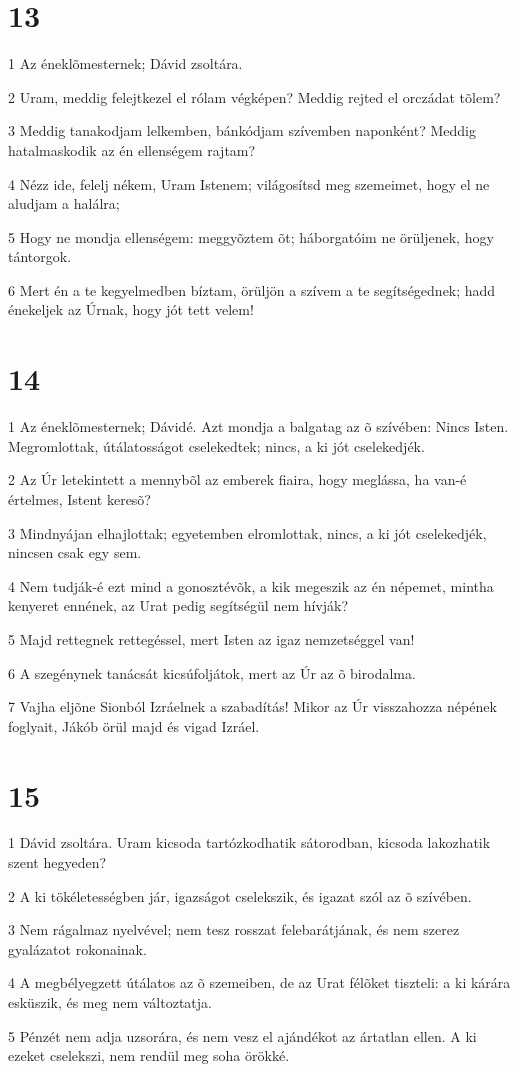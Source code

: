 \chapter{13}

\par 1 Az éneklõmesternek; Dávid zsoltára.
\par 2 Uram, meddig felejtkezel el rólam végképen? Meddig rejted el orczádat tõlem?
\par 3 Meddig tanakodjam lelkemben, bánkódjam szívemben naponként? Meddig hatalmaskodik az én ellenségem rajtam?
\par 4 Nézz ide, felelj nékem, Uram Istenem; világosítsd meg szemeimet, hogy el ne aludjam a halálra;
\par 5 Hogy ne mondja ellenségem: meggyõztem õt; háborgatóim ne örüljenek, hogy tántorgok.
\par 6 Mert én a te kegyelmedben bíztam, örüljön a szívem a te segítségednek; hadd énekeljek az Úrnak, hogy jót tett velem!

\chapter{14}

\par 1 Az éneklõmesternek; Dávidé. Azt mondja a balgatag az õ szívében: Nincs Isten. Megromlottak, útálatosságot cselekedtek; nincs, a ki jót cselekedjék.
\par 2 Az Úr letekintett a mennybõl az emberek fiaira, hogy meglássa, ha van-é értelmes, Istent keresõ?
\par 3 Mindnyájan elhajlottak; egyetemben elromlottak, nincs, a ki jót cselekedjék, nincsen csak egy sem.
\par 4 Nem tudják-é ezt mind a gonosztévõk, a kik megeszik az én népemet, mintha kenyeret ennének, az Urat pedig segítségül nem hívják?
\par 5 Majd rettegnek rettegéssel, mert Isten az igaz nemzetséggel van!
\par 6 A szegénynek tanácsát kicsúfoljátok, mert az Úr az õ birodalma.
\par 7 Vajha eljõne Sionból Izráelnek a szabadítás! Mikor az Úr visszahozza népének foglyait, Jákób örül majd és vigad Izráel.

\chapter{15}

\par 1 Dávid zsoltára. Uram kicsoda tartózkodhatik sátorodban, kicsoda lakozhatik szent hegyeden?
\par 2 A ki tökéletességben jár, igazságot cselekszik, és igazat szól az õ szívében.
\par 3 Nem rágalmaz nyelvével; nem tesz rosszat felebarátjának, és nem szerez gyalázatot rokonainak.
\par 4 A megbélyegzett útálatos az õ szemeiben, de az Urat félõket tiszteli: a ki kárára esküszik, és meg nem változtatja.
\par 5 Pénzét nem adja uzsorára, és nem vesz el ajándékot az ártatlan ellen. A ki ezeket cselekszi, nem rendül meg soha örökké.

